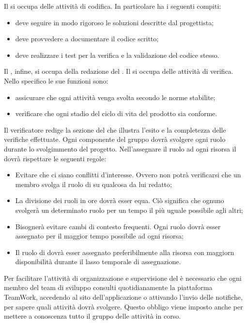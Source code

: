 				Il  si occupa delle attività di codifica. In particolare ha i seguenti compiti:
				\begin{itemize}
					\item deve seguire in modo rigoroso le soluzioni descritte dal progettista;
					\item deve provvedere a documentare il codice scritto;
					\item deve realizzare i test per la verifica e la validazione del codice stesso.
				\end{itemize}
				Il , infine, si occupa della redazione del .
				Il  si occupa delle attività di verifica. Nello specifico le sue funzioni sono:
				\begin{itemize}
					\item assicurare che ogni attività venga svolta secondo le norme stabilite;
					\item verificare che ogni stadio del ciclo di vita del prodotto sia conforme.
				\end{itemize}
				Il verificatore redige la sezione del  che illustra l’esito e la completezza delle verifiche effettuate.
			Ogni componente del gruppo dovrà svolgere ogni ruolo durante lo svolgimmento del progetto. Nell'assegnare il ruolo ad ogni risorsa
			il  dovrà rispettare le seguenti regole:
			\begin{itemize}
				\item Evitare che ci siano conflitti d'interesse. Ovvero non potrà verificarsi che un membro svolga il ruolo di 
				su qualcosa da lui redatto;
				\item La divisione dei ruoli in ore dovrà esser equa. Ciò significa che ognuno svolgerà un determinato ruolo per un tempo il più
				uguale possibile agli altri;
				\item Bisognerà evitare cambi di contesto frequenti. Ogni ruolo dovrà esser assegnato per il maggior tempo possibile ad ogni risorsa;
				\item Il ruolo di  dovrà esser assegnato preferibilmente alla risorsa con maggiorn disponibilità durante il lasso temporale 
				di assegnazione.
			\end{itemize}
		 \label{subsec:aggiornamentoStatoTicket}
			Per facilitare l'attività di organizzazione e supervisione del  è necessario che ogni membro del team di sviluppo consulti quotidianamente la piattaforma TeamWork, accedendo al sito dell'applicazione o attivando l'invio delle notifiche, per sapere quali attività dovrà svolgere. Questo obbligo viene imposto anche per mettere a conoscenza tutto il gruppo delle attività in corso.\\
